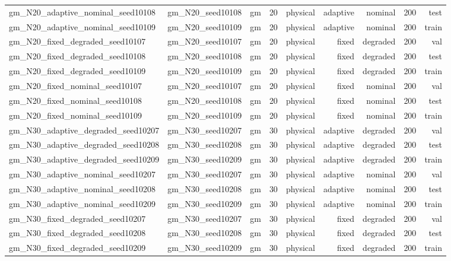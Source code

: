 \begin{tabular}{lrrrrrrrr}
gm\_N20\_adaptive\_nominal\_seed10108 & gm\_N20\_seed10108 & gm & 20 & physical & adaptive & nominal & 200 & test \\
gm\_N20\_adaptive\_nominal\_seed10109 & gm\_N20\_seed10109 & gm & 20 & physical & adaptive & nominal & 200 & train \\
gm\_N20\_fixed\_degraded\_seed10107 & gm\_N20\_seed10107 & gm & 20 & physical & fixed & degraded & 200 & val \\
gm\_N20\_fixed\_degraded\_seed10108 & gm\_N20\_seed10108 & gm & 20 & physical & fixed & degraded & 200 & test \\
gm\_N20\_fixed\_degraded\_seed10109 & gm\_N20\_seed10109 & gm & 20 & physical & fixed & degraded & 200 & train \\
gm\_N20\_fixed\_nominal\_seed10107 & gm\_N20\_seed10107 & gm & 20 & physical & fixed & nominal & 200 & val \\
gm\_N20\_fixed\_nominal\_seed10108 & gm\_N20\_seed10108 & gm & 20 & physical & fixed & nominal & 200 & test \\
gm\_N20\_fixed\_nominal\_seed10109 & gm\_N20\_seed10109 & gm & 20 & physical & fixed & nominal & 200 & train \\
gm\_N30\_adaptive\_degraded\_seed10207 & gm\_N30\_seed10207 & gm & 30 & physical & adaptive & degraded & 200 & val \\
gm\_N30\_adaptive\_degraded\_seed10208 & gm\_N30\_seed10208 & gm & 30 & physical & adaptive & degraded & 200 & test \\
gm\_N30\_adaptive\_degraded\_seed10209 & gm\_N30\_seed10209 & gm & 30 & physical & adaptive & degraded & 200 & train \\
gm\_N30\_adaptive\_nominal\_seed10207 & gm\_N30\_seed10207 & gm & 30 & physical & adaptive & nominal & 200 & val \\
gm\_N30\_adaptive\_nominal\_seed10208 & gm\_N30\_seed10208 & gm & 30 & physical & adaptive & nominal & 200 & test \\
gm\_N30\_adaptive\_nominal\_seed10209 & gm\_N30\_seed10209 & gm & 30 & physical & adaptive & nominal & 200 & train \\
gm\_N30\_fixed\_degraded\_seed10207 & gm\_N30\_seed10207 & gm & 30 & physical & fixed & degraded & 200 & val \\
gm\_N30\_fixed\_degraded\_seed10208 & gm\_N30\_seed10208 & gm & 30 & physical & fixed & degraded & 200 & test \\
gm\_N30\_fixed\_degraded\_seed10209 & gm\_N30\_seed10209 & gm & 30 & physical & fixed & degraded & 200 & train \\

\end{tabular}
